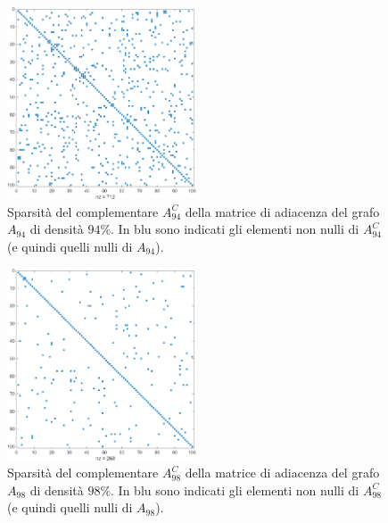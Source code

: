\documentclass[a4paper]{article}
\begin{document}
\begin{figure}[H]
    \centering
    \includegraphics[width=0.5\textwidth]{images/94_spy.png} %
    \caption{Sparsità del complementare $A_{94}^C$ della matrice di adiacenza del grafo $A_{94}$ di densità $94\%$. In blu sono indicati gli elementi non nulli
    di $A_{94}^C$ (e quindi quelli nulli di $A_{94}$).}
    \label{fig:spy_94}
\end{figure}

\begin{figure}[H]
    \centering
    \includegraphics[width=0.5\textwidth]{images/98_spy.png} %
    \caption{Sparsità del complementare $A_{98}^C$ della matrice di adiacenza del grafo $A_{98}$ di densità $98\%$. In blu sono indicati gli elementi non nulli
    di $A_{98}^C$ (e quindi quelli nulli di $A_{98}$).}
    \label{fig:spy_98}
\end{figure}
\end{document}
